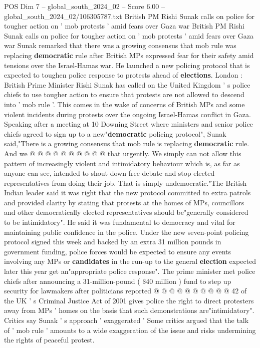 \begin{textsample}{POS Dim 7 – global\_south\_2024\_02 – Score 6.00 – global\_south\_2024\_02/106305787.txt}  \label{ex:f7_pos_201}
British PM Rishi Sunak calls on police for tougher action on ' mob protests ' amid fears over Gaza war British PM Rishi Sunak calls on police for tougher action on ' mob protests ' amid fears over Gaza war Sunak remarked that there was a growing consensus that mob rule was replacing \textbf{democratic} rule after British MPs expressed fear for their safety amid tensions over the Israel-Hamas war.
He launched a new policing protocol that is expected to toughen police response to protests ahead of \textbf{elections}.
London : British Prime Minister Rishi Sunak has called on the United Kingdom ' s police chiefs to use tougher action to ensure that protests are not allowed to descend into ' mob rule '.
This comes in the wake of concerns of British MPs and some violent incidents during protests over the ongoing Israel-Hamas conflict in Gaza.
Speaking after a meeting at 10 Downing Street where ministers and senior police chiefs agreed to sign up to a new"\textbf{democratic} policing protocol", Sunak said,"There is a growing consensus that mob rule is replacing \textbf{democratic} rule.
And we @ @ @ @ @ @ @ @ @ @ that urgently.
We simply can not allow this pattern of increasingly violent and intimidatory behaviour which is, as far as anyone can see, intended to shout down free debate and stop elected representatives from doing their job.
That is simply undemocratic."The British Indian leader said it was right that the new protocol committed to extra patrols and provided clarity by stating that protests at the homes of MPs, councillors and other democratically elected representatives should be"generally considered to be intimidatory".
He said it was fundamental to democracy and vital for maintaining public confidence in the police.
Under the new seven-point policing protocol signed this week and backed by an extra 31 million pounds in government funding, police forces would be expected to ensure any events involving any MPs or \textbf{candidates} in the run-up to the general \textbf{election} expected later this year get an"appropriate police response".
The prime minister met police chiefs after announcing a 31-million-pound ( \$40 million ) fund to step up security for lawmakers after politicians reported @ @ @ @ @ @ @ @ @ @ 42 of the UK ' s Criminal Justice Act of 2001 gives police the right to direct protesters away from MPs ' homes on the basis that such demonstrations are"intimidatory".
Critics say Sunak ' s approach ' exaggerated ' Some critics argued that the talk of ' mob rule ' amounts to a wide exaggeration of the issue and risks undermining the rights of peaceful protest.

\end{textsample}

